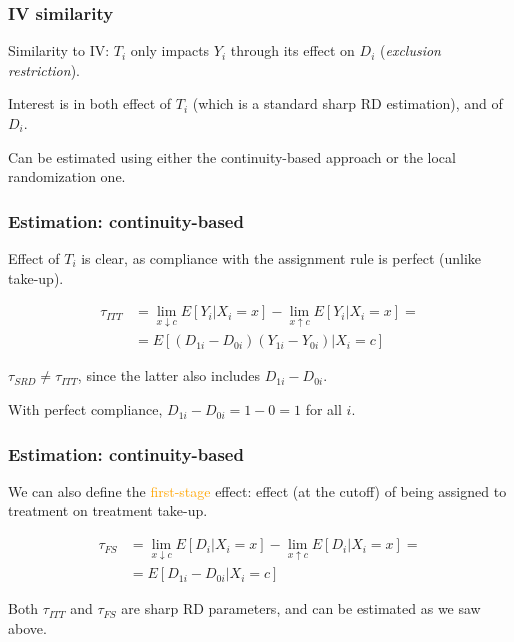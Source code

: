 \documentclass[12pt,english,dvipsnames,aspectratio=169,handout]{beamer}\usepackage[]{graphicx}\usepackage[]{xcolor}
\begin{document}
\begin{frame}
\frametitle{IV similarity}
Similarity to IV: $T_i$ only impacts $Y_i$ through its effect on $D_i$ (\textit{exclusion restriction}).\bigskip
\pause

Interest is in both effect of $T_i$ (which is a standard sharp RD estimation), and of $D_i$.\bigskip
\pause

Can be estimated using either the continuity-based approach or the local randomization one.

\end{frame}


\begin{frame}
\frametitle{Estimation: continuity-based}
Effect of $T_i$ is clear, as compliance with the assignment rule is perfect (unlike take-up).\pause

\begin{align*}
\tau_{ITT} &= \lim_{x \downarrow c}E[Y_i | X_i = x] - \lim_{x \uparrow c}E[Y_i | X_i = x] = \\
           &= E[(D_{1i} - D_{0i})(Y_{1i} - Y_{0i}) | X_i = c]
\end{align*}\pause

$\tau_{SRD} \neq \tau_{ITT}$, since the latter also includes $D_{1i} - D_{0i}$.\bigskip
\pause

With perfect compliance, $D_{1i} - D_{0i} = 1 - 0 = 1$ for all $i$.

\end{frame}


\begin{frame}
\frametitle{Estimation: continuity-based}
We can also define the \textcolor{orange}{first-stage} effect: effect (at the cutoff) of being assigned to treatment on treatment take-up.\pause

\begin{align*}
\tau_{FS} &= \lim_{x \downarrow c}E[D_i | X_i = x] - \lim_{x \uparrow c}E[D_i | X_i = x] = \\
          &= E[D_{1i} - D_{0i} | X_i = c]
\end{align*}\pause

Both $\tau_{ITT}$ and $\tau_{FS}$ are sharp RD parameters, and can be estimated as we saw above.

\end{frame}
\end{document}
